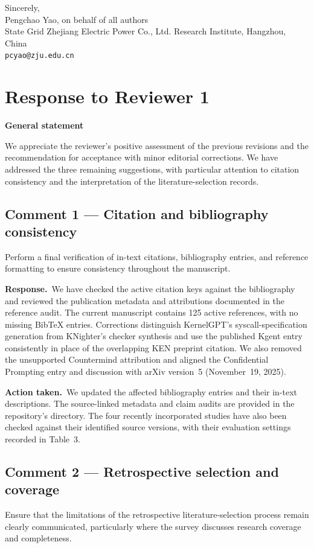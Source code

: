 \documentclass[11pt,a4paper]{article}
\newcommand{\response}{\par\textbf{Response.}\ }
\newcommand{\action}{\par\textbf{Action taken.}\ }
\begin{document}
Sincerely,\\
Pengchao Yao, on behalf of all authors\\
State Grid Zhejiang Electric Power Co., Ltd. Research Institute, Hangzhou, China\\
\texttt{pcyao@zju.edu.cn}

\section{Response to Reviewer 1}

\textbf{General statement}

We appreciate the reviewer's positive assessment of the previous revisions and the recommendation for acceptance with minor editorial corrections. We have addressed the three remaining suggestions, with particular attention to citation consistency and the interpretation of the literature-selection records.

\clearpage
\subsection{Comment 1 --- Citation and bibliography consistency}
\begin{reviewcomment}
Perform a final verification of in-text citations, bibliography entries, and reference formatting to ensure consistency throughout the manuscript.
\end{reviewcomment}

\response We have checked the active citation keys against the bibliography and reviewed the publication metadata and attributions documented in the reference audit. The current manuscript contains 125 active references, with no missing BibTeX entries. Corrections distinguish KernelGPT's syscall-specification generation from KNighter's checker synthesis and use the published Kgent entry consistently in place of the overlapping KEN preprint citation. We also removed the unsupported Countermind attribution and aligned the Confidential Prompting entry and discussion with arXiv version~5 (November~19, 2025).

\action We updated the affected bibliography entries and their in-text descriptions. The source-linked metadata and claim audits are provided in the repository's  directory. The four recently incorporated studies have also been checked against their identified source versions, with their evaluation settings recorded in Table~3.

\subsection{Comment 2 --- Retrospective selection and coverage}
\begin{reviewcomment}
Ensure that the limitations of the retrospective literature-selection process remain clearly communicated, particularly where the survey discusses research coverage and completeness.
\end{reviewcomment}
\end{document}
